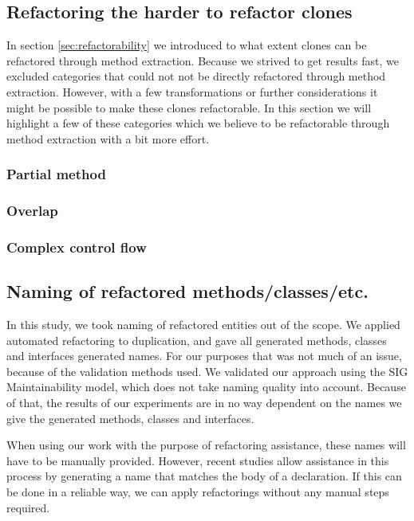 \subsection{Refactoring the harder to refactor clones}
In section \ref{sec:refactorability} we introduced to what extent clones can be refactored through method extraction. Because we strived to get results fast, we excluded categories that could not not be directly refactored through method extraction. However, with a few transformations or further considerations it might be possible to make these clones refactorable. In this section we will highlight a few of these categories which we believe to be refactorable through method extraction with a bit more effort.

\subsubsection{Partial method}

\subsubsection{Overlap}

\subsubsection{Complex control flow}

\subsection{Naming of refactored methods/classes/etc.}
In this study, we took naming of refactored entities out of the scope. We applied automated refactoring to duplication, and gave all generated methods, classes and interfaces generated names. For our purposes that was not much of an issue, because of the validation methods used. We validated our approach using the SIG Maintainability model, which does not take naming quality into account. Because of that, the results of our experiments are in no way dependent on the names we give the generated methods, classes and interfaces.

When using our work with the purpose of refactoring assistance, these names will have to be manually provided. However, recent studies allow assistance in this process by generating a name that matches the body of a declaration. If this can be done in a reliable way, we can apply refactorings without any manual steps required.


